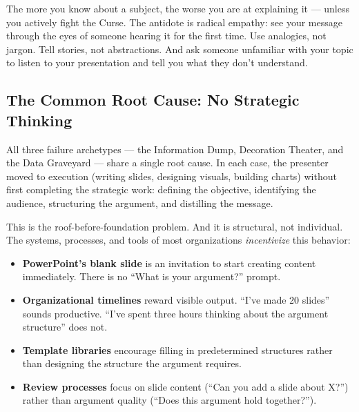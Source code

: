 \begin{alertbox}
The more you know about a subject, the worse you are at explaining it --- unless you actively fight the Curse. The antidote is radical empathy: see your message through the eyes of someone hearing it for the first time. Use analogies, not jargon. Tell stories, not abstractions. And ask someone unfamiliar with your topic to listen to your presentation and tell you what they don't understand.
\end{alertbox}

\subsection{The Common Root Cause: No Strategic Thinking}


All three failure archetypes --- the Information Dump, Decoration Theater, and the Data Graveyard --- share a single root cause. In each case, the presenter moved to execution (writing slides, designing visuals, building charts) without first completing the strategic work: defining the objective, identifying the audience, structuring the argument, and distilling the message.

This is the roof-before-foundation problem. And it is structural, not individual. The systems, processes, and tools of most organizations \emph{incentivize} this behavior:

\begin{itemize}
  \item \textbf{PowerPoint's blank slide} is an invitation to start creating content immediately. There is no ``What is your argument?'' prompt.
  \item \textbf{Organizational timelines} reward visible output. ``I've made 20 slides'' sounds productive. ``I've spent three hours thinking about the argument structure'' does not.
  \item \textbf{Template libraries} encourage filling in predetermined structures rather than designing the structure the argument requires.
  \item \textbf{Review processes} focus on slide content (``Can you add a slide about X?'') rather than argument quality (``Does this argument hold together?'').
\end{itemize}

